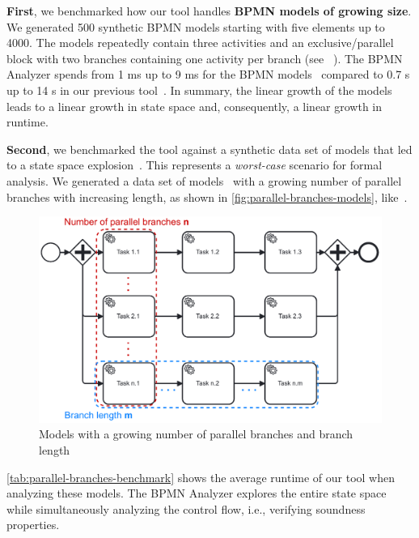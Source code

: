 \documentclass[
onecolumn, %
]{ceurart}
\begin{document}
\textbf{First}, we benchmarked how our tool handles \textbf{BPMN models of growing size}.
We generated 500 synthetic BPMN models starting with five elements up to 4000.
The models repeatedly contain three activities and an exclusive/parallel block with two branches containing one activity per branch (see ~\cite{krauterInstantaneousComprehensibleFixable2024}).
The BPMN Analyzer spends from 1 ms up to 9 ms for the BPMN models~\cite{krauterInstantaneousComprehensibleFixable2024} compared to 0.7 s up to 14 s in our previous tool~\cite{krauterFormalizationAnalysisBPMN2023}.
In summary, the linear growth of the models leads to a linear growth in state space and, consequently, a linear growth in runtime.

\textbf{Second}, we benchmarked the tool against a synthetic data set of models that led to a state space explosion~\cite{clarkeHandbookModelChecking2018}.
This represents a \textit{worst-case} scenario for formal analysis.
We generated a data set of models~\cite{krauterInstantaneousComprehensibleFixable2024} with a growing number of parallel branches with increasing length, as shown in \autoref{fig:parallel-branches-models}, like~\cite{corradiniFormalApproachAnalysis2021}.

\begin{figure}[ht]
	\centering
	\includegraphics[width=0.5\linewidth]{images/parallel-branches}
	\caption{Models with a growing number of parallel branches and branch length}
	\label{fig:parallel-branches-models}
\end{figure}

\autoref{tab:parallel-branches-benchmark} shows the average runtime of our tool when analyzing these models.
The BPMN Analyzer explores the entire state space while simultaneously analyzing the control flow, i.e., verifying soundness properties.
\end{document}
